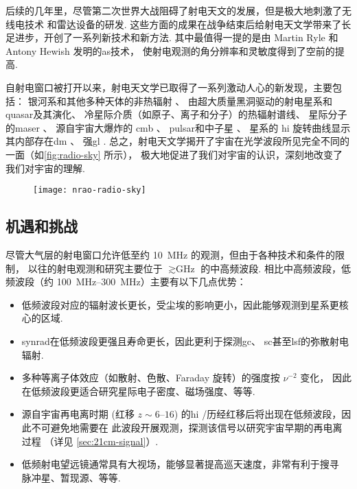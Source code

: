 后续的几年里，尽管第二次世界大战阻碍了射电天文的发展，但是极大地刺激了无线电技术
和雷达设备的研发.
这些方面的成果在战争结束后给射电天文学带来了长足进步，开创了一系列新技术和新方法.
其中最值得一提的是由 Martin Ryle 和 Antony Hewish 发明的\ac{as}技术，
使射电观测的角分辨率和灵敏度得到了空前的提高.

自射电窗口被打开以来，射电天文学已取得了一系列激动人心的新发现，主要包括：
银河系和其他多种天体的非热辐射 \cite{reber1940}、
由超大质量黑洞驱动的射电星系\cite{baade1954}和\ac{quasar}\cite{hazard1963,schmidt1963}及其演化、
冷星际介质（如原子、离子和分子）的热辐射谱线、
星际分子的\ac{maser} \cite{weaver1965}、
源自宇宙大爆炸的 \ac{cmb} \cite{penzias1965}、
\ac{pulsar}和中子星 \cite{hewish1968}、
星系的 \ac{hi} 旋转曲线显示其内部存在\ac{dm} \cite{roberts1975}、
强\ac{gl} \cite{walsh1979}.
总之，射电天文学揭开了宇宙在光学波段所见完全不同的一面（如\autoref{fig:radio-sky} 所示），
极大地促进了我们对宇宙的认识，深刻地改变了我们对宇宙的理解.

\begin{figure}[htp]
  \centering
  \texttt{[image: nrao-radio-sky]}
  \label{fig:radio-sky}
\end{figure}

\subsection{机遇和挑战}

尽管大气层的射电窗口允许低至约 \SI{10}{\MHz} 的观测，但由于各种技术和条件的限制，
以往的射电观测和研究主要位于 $\gtrsim \si{\GHz}$ 的中高频波段.
相比中高频波段，低频波段（约 \SIrange{100}{300}{\MHz}）主要有以下几点优势：
\begin{itemize}
  \item 低频波段对应的辐射波长更长，受尘埃的影响更小，因此能够观测到星系更核心的区域.
  \item \ac{synrad}在低频波段更强且寿命更长，因此更利于探测\ac{gc}、
    \ac{sc}甚至\ac{lsf}的弥散射电辐射.
  \item 多种等离子体效应（如散射、色散、Faraday 旋转）的强度按 $\nu^{-2}$ 变化，
    因此在低频波段更适合研究星际电子密度、磁场强度、等等.
  \item 源自宇宙再电离时期 (红移 $z \sim \numrange{6}{16}$)
    的\ac{hi} \hisignal/历经红移后将出现在低频波段，因此不可避免地需要在
    此波段开展观测，探测该信号以研究宇宙早期的再电离过程
    （详见 \autoref{sec:21cm-signal}）.
  \item 低频射电望远镜通常具有大视场，能够显著提高巡天速度，非常有利于搜寻
    脉冲星、暂现源、等等.
\end{itemize}

